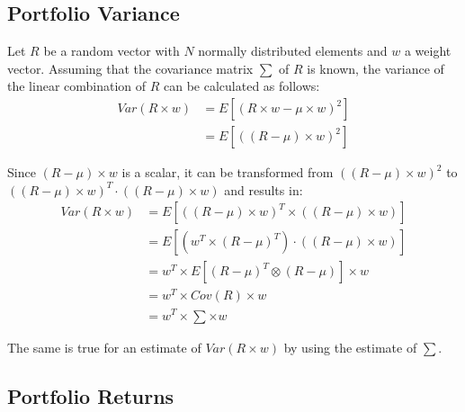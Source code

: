 \documentclass[
  oneside]{book}
\begin{document}
\hypertarget{portvar}{%
\subsection{Portfolio Variance}\label{portvar}}

Let \(R\) be a random vector with \(N\) normally distributed elements and \(w\) a weight vector. Assuming that the covariance matrix \(\sum\) of \(R\) is known, the variance of the linear combination of \(R\) can be calculated as follows:
\begin{align*}
  Var(R \times w) &= E[(R \times w - \mu \times w)^2] \\
  &= E[((R - \mu) \times w)^2]
\end{align*}

Since \((R - \mu) \times w\) is a scalar, it can be transformed from \(((R - \mu) \times w)^2\) to \(((R - \mu) \times w)^T \cdot ((R - \mu) \times w)\) and results in:
\begin{align*}
  Var(R \times w) &= E[((R - \mu) \times w)^T \times ((R - \mu) \times w)]\\ 
  &= E[(w^T \times (R - \mu)^T) \cdot ((R - \mu) \times w)]\\ 
  &= w^T \times E[(R - \mu)^T \otimes (R - \mu)] \times w \\
  &= w^T \times Cov(R) \times w \\
  &= w^T \times \textstyle\sum \times w
\end{align*}

The same is true for an estimate of \(Var(R \times w)\) by using the estimate of \(\textstyle\sum\).

\hypertarget{portfolioreturns}{%
\subsection{Portfolio Returns}\label{portfolioreturns}}
\end{document}
